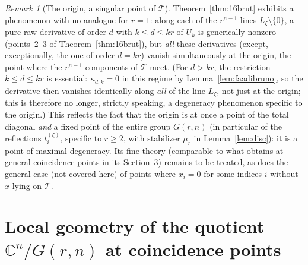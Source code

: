 \documentclass[11pt]{article}
\theoremstyle{remark}
\newtheorem{remark}[theorem]{Remark}
\newcommand{\CC}{\mathbb{C}}
\begin{document}
\begin{remark}[The origin, a singular point of $\mathcal T$]
Theorem~\ref{thm:16brut} exhibits a phenomenon with no analogue for $r=1$: along each of the $r^{n-1}$ lines $L_\zeta\setminus\{0\}$, a pure raw derivative of order $d$ with $k\le d\le kr$ of $U_k$ is generically nonzero (points~2--3 of Theorem~\ref{thm:16brut}), but \emph{all} these derivatives (except, exceptionally, the one of order $d=kr$) vanish simultaneously at the origin, the point where the $r^{n-1}$ components of $\mathcal T$ meet. (For $d>kr$, the restriction $k\le d\le kr$ is essential: $\kappa_{d,k}=0$ in this regime by Lemma~\ref{lem:faadibruno}, so the derivative then vanishes identically along \emph{all} of the line $L_\zeta$, not just at the origin; this is therefore no longer, strictly speaking, a degeneracy phenomenon specific to the origin.) This reflects the fact that the origin is at once a point of the total diagonal \emph{and} a fixed point of the entire group $G(r,n)$ (in particular of the reflections $t_i^{(\zeta)}$, specific to $r\ge2$, with stabilizer $\mu_r$ in Lemma~\ref{lem:disc}): it is a point of maximal degeneracy. Its fine theory (comparable to what \cite{Ze} obtains at general coincidence points in its Section~3) remains to be treated, as does the general case (not covered here) of points where $x_i=0$ for some indices $i$ without $x$ lying on $\mathcal T$.
\end{remark}

\section{Local geometry of the quotient $\CC^n/G(r,n)$ at coincidence points}\label{sec:trois-points}
\end{document}
